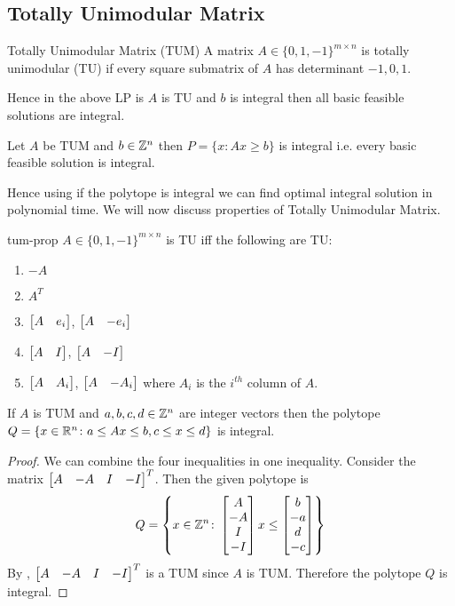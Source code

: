 \subsection{Totally Unimodular Matrix}
\begin{Definition}{Totally Unimodular Matrix (TUM)}{}
	A matrix $A\in \{0,1,-1\}^{m\times n}$ is totally unimodular (TU) if every square submatrix of $A$ has determinant $-1,0,1$.
\end{Definition}Hence in the above LP is $A$ is TU and $b$ is integral then all basic feasible solutions are integral.
\begin{lemma}{}{}
	Let $A$ be TUM and $b\in \mathbb{Z}^n$ then $P=\{x\colon Ax\geq b\}$ is integral i.e. every basic feasible solution is integral.
\end{lemma}

Hence using  if the polytope is integral we can find optimal integral solution in polynomial time. We will now discuss properties of Totally Unimodular Matrix.
\begin{lemma}{}{tum-prop}
	$A\in \{0,1,-1\}^{m\times n}$ is TU iff the following are TU:
	\begin{enumerate}[label=(\roman*)]
		\item $-A$
		\item $A^T$
		\item $\left[\begin{matrix}A & e_i\end{matrix}\right]$, $\left[\begin{matrix}A & -e_i\end{matrix}\right]$
		\item $\left[\begin{matrix}A& I\end{matrix}\right]$, $\left[\begin{matrix}A & -I\end{matrix}\right]$
		\item $\left[\begin{matrix}A & A_i\end{matrix}\right]$, $\left[\begin{matrix}A & -A_i\end{matrix}\right]$ where $A_i$ is the $i^{th}$ column of $A$. 
	\end{enumerate}
\end{lemma}


\begin{corolary}{}{}
	If $A$ is TUM and $a,b,c,d\in\mathbb{Z}^n$ are integer vectors then the polytope $Q=\{x\in \mathbb{R}^n\colon a\leq Ax\leq b, c\leq x\leq d\}$ is integral.
\end{corolary}
\begin{proof}
	We can combine the four inequalities in one inequality. Consider the matrix $\left[\begin{matrix}A & -A & I & -I\end{matrix}\right]^T$. Then the given polytope is $$Q=\left\{x\in\mathbb{Z}^n\colon \left[\begin{matrix}A \\ -A \\ I \\ -I\end{matrix}\right] x\leq \left[\begin{matrix}b \\-a\\ d \\ -c\end{matrix}\right]\right\}$$By , $\left[\begin{matrix}A & -A & I & -I\end{matrix}\right]^T$ is a TUM since $A$ is TUM. Therefore the polytope $Q$ is integral.
\end{proof}

